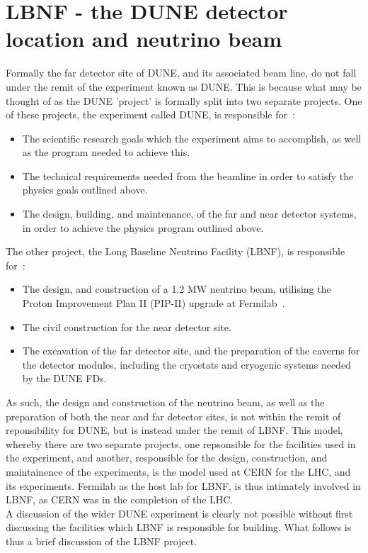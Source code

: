 \section{LBNF - the DUNE detector location and neutrino beam} \label{DUNE_LBNF} %
Formally the far detector site of DUNE, and its associated beam line, do not fall under the remit of the experiment known as DUNE. This is because what may be thought of as the DUNE 'project' is formally split into two separate projects. One of these projects, the experiment called DUNE, is responsible for~\citep{DUNECDR_V1}:
\begin{itemize}
\item The scientific research goals which the experiment aims to accomplish, as well as the program needed to achieve this.
\item The technical requirements needed from the beamline in order to satisfy the physics goals outlined above.
\item The design, building, and maintenance, of the far and near detector systems, in order to achieve the physics program outlined above.  
\end{itemize}
The other project, the Long Baseline Neutrino Facility (LBNF), is responsible for~\citep{DUNECDR_V1}:
\begin{itemize}
\item The design, and construction of a 1.2 MW neutrino beam, utilising the Proton Improvement Plan II (PIP-II) upgrade at Fermilab~\citep{PIP-II}.
\item The civil construction for the near detector site.
\item The excavation of the far detector site, and the preparation of the caverns for the detector modules, including the cryostats and cryogenic systems needed by the DUNE FDs.
\end{itemize}
As such, the design and construction of the neutrino beam, as well as the preparation of both the near and far detector sites, is not within the remit of reponsibility for DUNE, but is instead under the remit of LBNF. This model, whereby there are two separate projects, one repsonsible for the facilities used in the experiment, and another, responsible for the design, construction, and maintainence of the experiments, is the model used at CERN for the LHC, and its experiments. Fermilab as the host lab for LBNF, is thus intimately involved in LBNF, as CERN was in the completion of the LHC. \\

A discussion of the wider DUNE experiment is clearly not possible without first discussing the facilities which LBNF is responsible for building. What follows is thus a brief discussion of the LBNF project. \\

